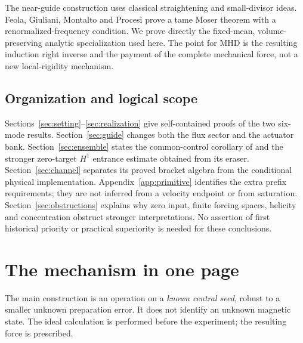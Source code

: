 \documentclass[11pt,a4paper]{amsart}
\theoremstyle{definition}
\theoremstyle{remark}
\numberwithin{equation}{section}
\begin{document}
The near-guide construction uses classical straightening and small-divisor ideas. Feola, Giuliani, Montalto and Procesi \cite[Theorem~3.1]{FGMP} prove a tame Moser theorem with a renormalized-frequency condition. We prove directly the fixed-mean, volume-preserving analytic specialization used here. The point for MHD is the resulting induction right inverse and the payment of the complete mechanical force, not a new local-rigidity mechanism.

\subsection{Organization and logical scope}
Sections~\ref{sec:setting}--\ref{sec:realization} give self-contained proofs of the two six-mode results. Section~\ref{sec:guide} changes both the flux sector and the actuator bank. Section~\ref{sec:ensemble} states the common-control corollary of \cite[Theorem~2.2]{CommonControl} and the stronger zero-target $H^1$ entrance estimate obtained from its eraser. Section~\ref{sec:channel} separates its proved bracket algebra from the conditional physical implementation. Appendix~\ref{app:primitive} identifies the extra prefix requirements; they are not inferred from a velocity endpoint or from saturation. Section~\ref{sec:obstructions} explains why zero input, finite forcing spaces, helicity and concentration obstruct stronger interpretations. No assertion of first historical priority or practical superiority is needed for these conclusions.



\section{The mechanism in one page}\label{sec:overview}

The main construction is an operation on a \emph{known central seed}, robust to a smaller unknown preparation error. It does not identify an unknown magnetic state. The ideal calculation is performed before the experiment; the resulting force is prescribed.
\end{document}
